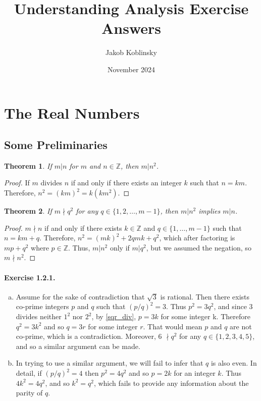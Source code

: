 \documentclass{article}
\title{Understanding Analysis Exercise Answers}
\author{ Jakob Koblinsky }
\date{November 2024}
\newtheorem{theorem}{Theorem}[section]
\begin{document}
\maketitle

\section{The Real Numbers}
\setcounter{subsection}{1}
\subsection{Some Preliminaries}
\begin{theorem}
    If $m|n$ for $m$ and $n\in \mathbb{Z}$, then $m|n^2$.
\end{theorem}
\begin{proof}
    If $m$ divides $n$ if and only if there exists an integer $k$ such that $n=km$. Therefore, $n^2=(km)^2=k(km^2)$.
\end{proof}

\begin{theorem}
\label{sqr_div}
    If $m \nmid q^2$ for any $q \in \{ 1,2,\dots,m-1 \}$, then $m|n^2$ implies $m|n$.
\end{theorem}
\begin{proof}
    $m\nmid n$ if and only if there exists $k\in \mathbb{Z}$ and $q\in\{1,\dots,m-1\}$ such that $n=km+q$. Therefore, $n^2=(mk)^2+2qmk+q^2$, which after factoring is $mp+q^2$ where $p\in\mathbb{Z}$. Thus, $m|n^2$ only if $m|q^2$, but we assumed the negation, so $m \nmid n^2$.
\end{proof}

\paragraph{Exercise 1.2.1.} 
\begin{enumerate}[(a)]
    \item Assume for the sake of contradiction that $\sqrt{3}$ is rational. Then there exists co-prime integers $p$ and $q$ such that $(p/q)^2=3$. Thus $p^2=3q^2$, and since 3 divides neither $1^2$ nor $2^2$, by \autoref{sqr_div}, $p=3k$ for some integer k. Therefore $q^2=3k^2$ and so $q=3r$ for some integer $r$. That would mean $p$ and $q$ are not co-prime, which is a contradiction. Moreover, 6 $\nmid q^2$ for any $q\in \{1,2,3,4,5\}$, and so a similar argument can be made. 
    \item In trying to use a similar argument, we will fail to infer that $q$ is also even. In detail, if $(p/q)^2=4$ then $p^2=4q^2$ and so $p=2k$ for an integer $k$. Thus $4k^2=4q^2$, and so $k^2=q^2$, which fails to provide any information about the parity of $q$.
\end{enumerate}
\end{document}
